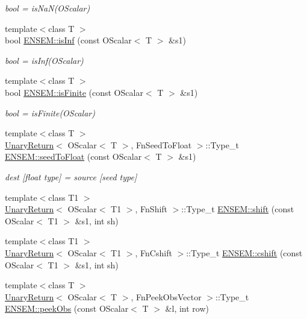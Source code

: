 \begin{DoxyCompactItemize}
\begin{DoxyCompactList}\small\item\em bool = is\+Na\+N(\+O\+Scalar) \end{DoxyCompactList}\item 
{\footnotesize template$<$class T $>$ }\\bool \mbox{\hyperlink{group__obsscalar_ga53c459a4a8b7d6d7df49c71d8c998c48}{E\+N\+S\+E\+M\+::is\+Inf}} (const O\+Scalar$<$ T $>$ \&s1)
\begin{DoxyCompactList}\small\item\em bool = is\+Inf(\+O\+Scalar) \end{DoxyCompactList}\item 
{\footnotesize template$<$class T $>$ }\\bool \mbox{\hyperlink{group__obsscalar_gaff9bdb2f6b1615afede07ee45e2ed616}{E\+N\+S\+E\+M\+::is\+Finite}} (const O\+Scalar$<$ T $>$ \&s1)
\begin{DoxyCompactList}\small\item\em bool = is\+Finite(\+O\+Scalar) \end{DoxyCompactList}\item 
{\footnotesize template$<$class T $>$ }\\\mbox{\hyperlink{structUnaryReturn}{Unary\+Return}}$<$ O\+Scalar$<$ T $>$, Fn\+Seed\+To\+Float $>$\+::Type\+\_\+t \mbox{\hyperlink{group__obsscalar_gad5154b123a75f53178134d8518242639}{E\+N\+S\+E\+M\+::seed\+To\+Float}} (const O\+Scalar$<$ T $>$ \&s1)
\begin{DoxyCompactList}\small\item\em dest \mbox{[}float type\mbox{]} = source \mbox{[}seed type\mbox{]} \end{DoxyCompactList}\item 
{\footnotesize template$<$class T1 $>$ }\\\mbox{\hyperlink{structUnaryReturn}{Unary\+Return}}$<$ O\+Scalar$<$ T1 $>$, Fn\+Shift $>$\+::Type\+\_\+t \mbox{\hyperlink{group__obsscalar_ga2baf234651cfec54ad620a11e79d6ac6}{E\+N\+S\+E\+M\+::shift}} (const O\+Scalar$<$ T1 $>$ \&s1, int sh)
\item 
{\footnotesize template$<$class T1 $>$ }\\\mbox{\hyperlink{structUnaryReturn}{Unary\+Return}}$<$ O\+Scalar$<$ T1 $>$, Fn\+Cshift $>$\+::Type\+\_\+t \mbox{\hyperlink{group__obsscalar_ga6e281512474808f7e211836b3d6607f3}{E\+N\+S\+E\+M\+::cshift}} (const O\+Scalar$<$ T1 $>$ \&s1, int sh)
\item 
{\footnotesize template$<$class T $>$ }\\\mbox{\hyperlink{structUnaryReturn}{Unary\+Return}}$<$ O\+Scalar$<$ T $>$, Fn\+Peek\+Obs\+Vector $>$\+::Type\+\_\+t \mbox{\hyperlink{group__obsscalar_ga39239dd32aa731cde63bf4ecdafd30a4}{E\+N\+S\+E\+M\+::peek\+Obs}} (const O\+Scalar$<$ T $>$ \&l, int row)

\end{DoxyCompactItemize}
